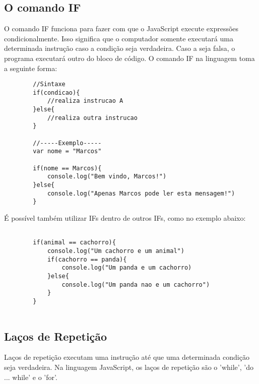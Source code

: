 	\subsection{O comando IF}
	O comando IF funciona para fazer com que o JavaScript execute expressões condicionalmente. Isso significa que o computador somente executará uma determinada instrução caso a condição seja verdadeira. Caso a seja falsa, o programa executará outro do bloco de código.
	O comando IF na linguagem toma a seguinte forma:
	\newline
	
	\begin{lstlisting}
		//Sintaxe
		if(condicao){
			//realiza instrucao A
		}else{
			//realiza outra instrucao
		}
		
		//-----Exemplo-----
		var nome = "Marcos"
		
		if(nome == Marcos){
			console.log("Bem vindo, Marcos!")
		}else{
			console.log("Apenas Marcos pode ler esta mensagem!")
		}
	\end{lstlisting}
	
	É possível também utilizar IFs dentro de outros IFs, como no exemplo abaixo:
	\newline
	\begin{lstlisting}
	
		if(animal == cachorro){
			console.log("Um cachorro e um animal")
			if(cachorro == panda){
				console.log("Um panda e um cachorro)
			}else{
				console.log("Um panda nao e um cachorro")
			}
		}
		
	\end{lstlisting}
	
	\subsection{Laços de Repetição}
	Laços de repetição executam uma instrução até que uma determinada condição seja verdadeira. Na linguagem JavaScript, os laços de repetição são o 'while', 'do ... while' e o 'for'.
	\newline
	\newline
	
